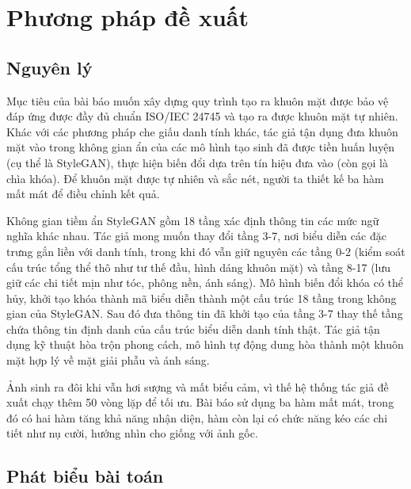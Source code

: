 \section{Phương pháp đề xuất}
\label{sec::phuong-phap-de-xuat}

\subsection{Nguyên lý}

Mục tiêu của bài báo muốn xây dựng quy trình tạo ra khuôn mặt được bảo vệ đáp ứng được đầy đủ chuẩn ISO/IEC 24745 và tạo ra được khuôn mặt tự nhiên. Khác với các phương pháp che giấu danh tính khác, tác giả tận dụng đưa khuôn mặt vào trong không gian ẩn của các mô hình tạo sinh đã được tiền huấn luyện (cụ thể là StyleGAN), thực hiện biến đổi dựa trên tín hiệu đưa vào (còn gọi là chìa khóa). Để khuôn mặt được tự nhiên và sắc nét, người ta thiết kế ba hàm mất mát để điều chỉnh kết quả.

Không gian tiềm ẩn StyleGAN gồm 18 tầng xác định thông tin các mức ngữ nghĩa khác nhau. Tác giả mong muốn thay đổi tầng 3-7, nơi biểu diễn các đặc trưng gắn liền với danh tính, trong khi đó vẫn giữ nguyên các tầng 0-2 (kiểm soát cấu trúc tổng thể thô như tư thế đầu, hình dáng khuôn mặt) và tầng 8-17 (lưu giữ các chi tiết mịn như tóc, phông nền, ánh sáng). Mô hình biến đổi khóa có thể hủy, khởi tạo khóa thành mã biểu diễn thành một cấu trúc 18 tầng trong không gian của StyleGAN. Sau đó đưa thông tin đã khởi tạo của tầng 3-7 thay thế tầng chứa thông tin định danh của cấu trúc biểu diễn danh tính thật. Tác giả tận dụng kỹ thuật hòa trộn phong cách, mô hình tự động dung hòa thành một khuôn mặt hợp lý về mặt giải phẫu và ánh sáng.

Ảnh sinh ra đôi khi vẫn hơi sượng và mất biểu cảm, vì thế hệ thống tác giả đề xuất chạy thêm 50 vòng lặp để tối ưu. Bài báo sử dụng ba hàm mất mát, trong đó có hai hàm tăng khả năng nhận diện, hàm còn lại có chức năng kéo các chi tiết như nụ cười, hướng nhìn cho giống với ảnh gốc.

\subsection{Phát biểu bài toán}

\begingroup
\setlength{\abovedisplayskip}{5pt plus 2pt minus 2pt}
\setlength{\belowdisplayskip}{5pt plus 2pt minus 2pt}

